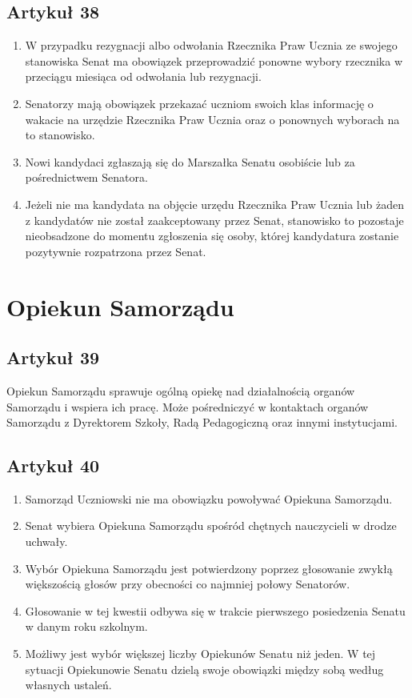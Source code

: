 \documentclass[14pt]{article}
\newenvironment{ustepy}{%
	\begin{enumerate}[leftmargin=1.5em, itemindent=1pt, labelwidth=1em, itemsep=5pt]
	}{%
	\end{enumerate}
}
\begin{document}
\subsection*{Artykuł 38}
\begin{ustepy}
	\item W przypadku rezygnacji albo odwołania Rzecznika Praw Ucznia ze swojego stanowiska Senat ma obowiązek przeprowadzić ponowne wybory rzecznika w przeciągu miesiąca od odwołania lub rezygnacji.
	\item Senatorzy mają obowiązek przekazać uczniom swoich klas informację o wakacie na urzędzie Rzecznika Praw Ucznia oraz o ponownych wyborach na to stanowisko.
	\item Nowi kandydaci zgłaszają się do Marszałka Senatu osobiście lub za pośrednictwem Senatora.
	\item Jeżeli nie ma kandydata na objęcie urzędu Rzecznika Praw Ucznia lub żaden z kandydatów nie został zaakceptowany przez Senat, stanowisko to pozostaje nieobsadzone do momentu zgłoszenia się osoby, której kandydatura zostanie pozytywnie rozpatrzona przez Senat.
\end{ustepy}
\section{Opiekun Samorządu}
\subsection*{Artykuł 39}
Opiekun Samorządu sprawuje ogólną opiekę nad działalnością organów Samorządu i wspiera ich pracę. Może pośredniczyć w kontaktach organów Samorządu z Dyrektorem Szkoły, Radą Pedagogiczną oraz innymi instytucjami.
\subsection*{Artykuł 40}
\begin{ustepy}
	\item Samorząd Uczniowski nie ma obowiązku powoływać Opiekuna Samorządu.
	\item Senat wybiera Opiekuna Samorządu spośród chętnych nauczycieli w drodze uchwały.
	\item Wybór Opiekuna Samorządu jest potwierdzony poprzez głosowanie zwykłą większością głosów przy obecności co najmniej połowy Senatorów.
	\item Głosowanie w tej kwestii odbywa się w trakcie pierwszego posiedzenia Senatu w danym roku szkolnym. 
	\item Możliwy jest wybór większej liczby Opiekunów Senatu niż jeden. W tej sytuacji Opiekunowie Senatu dzielą swoje obowiązki między sobą według własnych ustaleń.
\end{ustepy}
\end{document}
